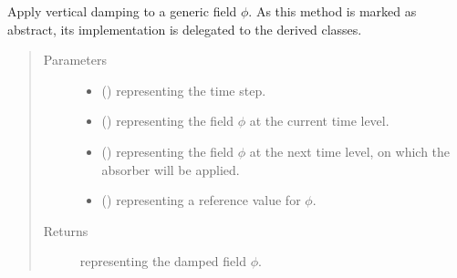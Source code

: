 \documentclass[letterpaper,10pt,english]{sphinxmanual}
\begin{document}
\begin{fulllineitems}
\begin{fulllineitems}
\end{fulllineitems}


\begin{fulllineitems}
\label{\detokenize{api:dycore.vertical_damping.VerticalDamping.apply}}
Apply vertical damping to a generic field \(\phi\).
As this method is marked as abstract, its implementation is delegated to the derived classes.
\begin{quote}\begin{description}
\item[{Parameters}] \leavevmode\begin{itemize}
\item {} 
 () \textendash{}  representing the time step.

\item {} 
 () \textendash{}  representing the field \(\phi\) at the current time level.

\item {} 
 () \textendash{}  representing the field \(\phi\) at the next time level, on
which the absorber will be applied.

\item {} 
 () \textendash{}  representing a reference value for \(\phi\).

\end{itemize}

\item[{Returns}] \leavevmode
{} representing the damped field \(\phi\).


\end{description}
\end{quote}
\end{fulllineitems}
\end{fulllineitems}
\end{document}
